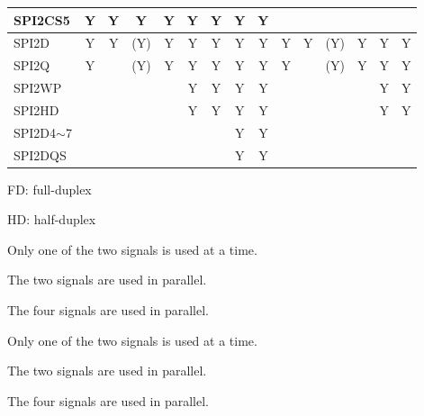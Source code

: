\documentclass[main\_\_EN.tex]{subfiles}
\begin{document}
\begin{landscape}
\begin{table}[H]
\begin{threeparttable}
\begin{tabular}{ |p{2.0cm} |c|c|c|c|c|c|c|c|c|c|c|c|c|c| }
SPI2CS5                  & Y       & Y       & Y       & Y       & Y       & Y      & Y       & Y      &         &        &         &         &         &        \\ \hline
SPI2D                    & Y       & Y       & (Y)\tnote{3}      & Y\tnote{4}      & Y\tnote{5}      & Y      & Y       & Y      & Y       & Y      & (Y)\tnote{6}      & Y\tnote{7}     & Y\tnote{8}     & Y      \\ \hline
SPI2Q                    & Y       &         & (Y)\tnote{3}      & Y\tnote{4}      & Y\tnote{5}      & Y       & Y      & Y      & Y       &        & (Y)\tnote{6}     & Y\tnote{7}     & Y\tnote{8}      & Y      \\ \hline
SPI2WP                   &         &         &         &         & Y\tnote{5}      & Y       & Y      & Y      &         &        &         &         & Y\tnote{8}       & Y      \\ \hline
SPI2HD                   &         &         &         &         & Y\tnote{5}      & Y       & Y      & Y      &         &        &         &         & Y\tnote{8}       & Y      \\ \hline
SPI2D4$\sim$7 &         &         &         &         &       &        & Y      & Y      &         &        &         &         &        &      \\ \hline
SPI2DQS &         &         &         &         &       &        & Y      & Y      &         &        &         &         &        &      \\ \hline
\end{tabular}

                \begin{tablenotes}
                \item[1] FD: full-duplex
                \item[2] HD: half-duplex
                \item[3] Only one of the two signals is used at a time.
                \item[4] The two signals are used in parallel.
                \item[5] The four signals are used in parallel.
                \item[6] Only one of the two signals is used at a time.
                \item[7] The two signals are used in parallel.
                \item[8] The four signals are used in parallel.
        \end{tablenotes}
     \end{threeparttable}
    \end{table}



\end{landscape}
\end{document}
